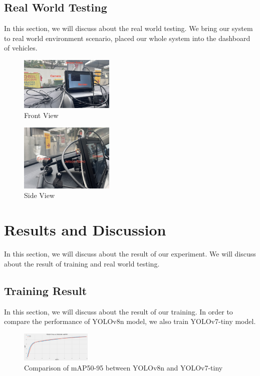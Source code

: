 \documentclass[conference]{IEEEtran}
\begin{document}
\subsection{Real World Testing}
In this section, we will discuss about the real world testing. We bring our system to real world environment scenario, placed our whole system into the dashboard of vehicles.
\begin{figure}[h!]
    \centering
    \includegraphics[width=0.4\textwidth,keepaspectratio]{mounted_camera_front_view.jpg}
    \caption{Front View}
    \label{fig:front_view}
\end{figure}

\begin{figure}[h!]
    \centering
    \includegraphics[width=0.4\textwidth,keepaspectratio]{mounted_camera_side_view.jpg}
    \caption{Side View}
    \label{fig:side_view}
\end{figure}


\section{Results and Discussion}
In this section, we will discuss about the result of our experiment. We will discuss about the result of training and real world testing.
\subsection{Training Result}
In this section, we will discuss about the result of our training. In order to compare the performance of YOLOv8n model, we also train YOLOv7-tiny model.

\begin{figure}[h!]
\centering
\includegraphics[width=0.3\textwidth,keepaspectratio]{YOLOv7-tinyvsYOLOv8n.png}
\caption{Comparison of mAP50-95 between YOLOv8n and YOLOv7-tiny}
\label{fig:mAP_comparison}
\end{figure}
\end{document}
